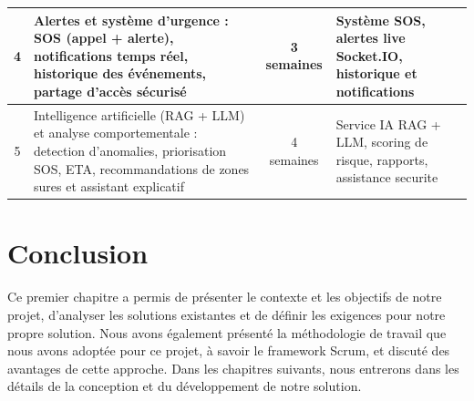 \begin{longtable}{|c|p{6.8cm}|c|p{5cm}|}
    4 &
    Alertes et système d'urgence :
    SOS (appel + alerte), notifications temps réel,
    historique des événements, partage d'accès sécurisé &
    3 semaines &
    Système SOS, alertes live Socket.IO, historique et notifications \\
    \hline

    5 &
    Intelligence artificielle (RAG + LLM) et analyse comportementale :
    detection d'anomalies, priorisation SOS, ETA,
    recommandations de zones sures et assistant explicatif &
    4 semaines &
    Service IA RAG + LLM, scoring de risque, rapports, assistance securite \\
    \hline

\end{longtable}
\section*{Conclusion}
Ce premier chapitre a permis de présenter le contexte et les objectifs de notre projet, d'analyser les solutions existantes et de définir les exigences pour notre propre solution. Nous avons également présenté la méthodologie de travail que nous avons adoptée pour ce projet, à savoir le framework Scrum, et discuté des avantages de cette approche. Dans les chapitres suivants, nous entrerons dans les détails de la conception et du développement de notre solution.
